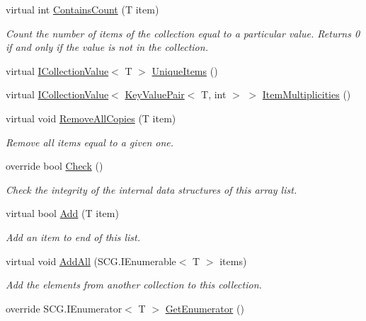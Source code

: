 \begin{DoxyCompactItemize}
virtual int \hyperlink{class_c5_1_1_array_list_a64988ea7ea5325a0ee85d96ed32401dd}{Contains\+Count} (T item)
\begin{DoxyCompactList}\small\item\em Count the number of items of the collection equal to a particular value. Returns 0 if and only if the value is not in the collection. \end{DoxyCompactList}\item 
virtual \hyperlink{interface_c5_1_1_i_collection_value}{I\+Collection\+Value}$<$ T $>$ \hyperlink{class_c5_1_1_array_list_a3d9b907977cfdf33ae2dbb7176c22ec8}{Unique\+Items} ()
\item 
virtual \hyperlink{interface_c5_1_1_i_collection_value}{I\+Collection\+Value}$<$ \hyperlink{struct_c5_1_1_key_value_pair}{Key\+Value\+Pair}$<$ T, int $>$ $>$ \hyperlink{class_c5_1_1_array_list_a335c5003a3607d44e571f7fa444e75cb}{Item\+Multiplicities} ()
\item 
virtual void \hyperlink{class_c5_1_1_array_list_a375c1c5bb0d8b80208b32f90128f7347}{Remove\+All\+Copies} (T item)
\begin{DoxyCompactList}\small\item\em Remove all items equal to a given one. \end{DoxyCompactList}\item 
override bool \hyperlink{class_c5_1_1_array_list_adf389b80c82b6f6164c275e735148eed}{Check} ()
\begin{DoxyCompactList}\small\item\em Check the integrity of the internal data structures of this array list. \end{DoxyCompactList}\item 
virtual bool \hyperlink{class_c5_1_1_array_list_a31f07a779aa64ee15f6875ab74682cb5}{Add} (T item)
\begin{DoxyCompactList}\small\item\em Add an item to end of this list. \end{DoxyCompactList}\item 
virtual void \hyperlink{class_c5_1_1_array_list_ae84250369cc406ec412bc2962acdf9e4}{Add\+All} (S\+C\+G.\+I\+Enumerable$<$ T $>$ items)
\begin{DoxyCompactList}\small\item\em Add the elements from another collection to this collection. \end{DoxyCompactList}\item 
override S\+C\+G.\+I\+Enumerator$<$ T $>$ \hyperlink{class_c5_1_1_array_list_ae6c2dc2f2aa8c9952d3267a37e9de01a}{Get\+Enumerator} ()

\end{DoxyCompactItemize}
